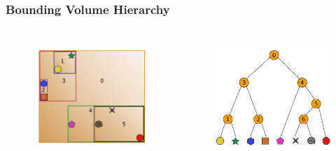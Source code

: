 \documentclass{beamer}
\begin{document}
\begin{frame}
  \frametitle{Bounding Volume Hierarchy}
  
\begin{columns}[t]

\begin{figure}
\includegraphics[height=45mm]{build3.png}
\end{figure}

\begin{figure}
\includegraphics[height=45mm]{primitive_tree_narrow.png}
\end{figure}
\end{columns}
\end{frame}
\end{document}
